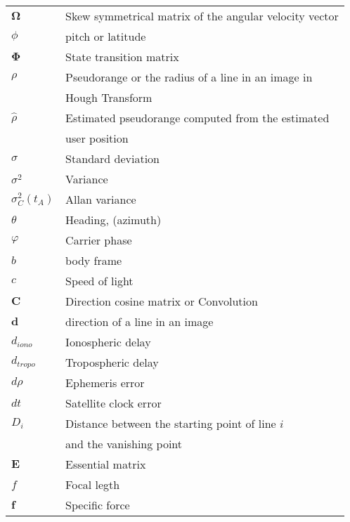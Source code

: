 \newpage
\begin{tabular}{l@{\hspace{3cm}}l}
$\mathbf\Omega$ & Skew symmetrical matrix of the angular velocity vector\\[2.0ex]
$\phi$ & pitch or latitude\\[2.0ex]
$\mathbf \Phi$ & State transition matrix\\[2.0ex]
$\rho$ & Pseudorange or the radius of a line in an image in \\[0.5ex]
{} & Hough Transform \\[2.0ex]
$\hat\rho$ & Estimated pseudorange computed from the estimated\\[0.5ex]
{} &  user position\\[2.0ex]
$\sigma$ & Standard deviation\\[2.0ex]
$\sigma^2$ & Variance\\[2.0ex]
$\sigma^2_C(t_A)$ & Allan variance\\[2.0ex]
$\theta$ & Heading, (azimuth) \\ [2.0ex]
$\varphi$ & Carrier phase\\[2.0ex]
$b$ & body frame\\[2.0ex]
$c$ & Speed of light\\[2.0ex]
$\mathbf C$ & Direction cosine matrix or Convolution\\[2.0ex]
$\mathbf d$ & direction of a line in an image\\[2.0ex]
$d_{iono}$ & Ionospheric delay\\[2.0ex]
$d_{tropo}$ & Tropospheric delay\\[2.0ex]
$d\rho$ & Ephemeris error\\[2.0ex]
$dt$ & Satellite clock error\\[2.0ex]
$D_i$ & Distance between the starting point of line $i$\\[0.5ex]
{} & and the vanishing point\\[2.0ex]
$\mathbf E$ & Essential matrix\\[2.0ex]
$f$ & Focal legth\\[2.0ex]
$\mathbf f$ & Specific force\\[2.0ex]
\end{tabular}
\newpage
